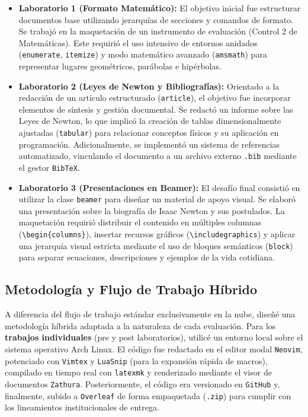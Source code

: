 \begin{itemize}
	\item \textbf{Laboratorio 1 (Formato Matemático):} El objetivo inicial fue estructurar documentos base utilizando jerarquías de secciones y comandos de formato. Se trabajó en la maquetación de un instrumento de evaluación (Control 2 de Matemáticas). Este requirió el uso intensivo de entornos anidados (\texttt{enumerate}, \texttt{itemize}) y modo matemático avanzado (\texttt{amsmath}) para representar lugares geométricos, parábolas e hipérbolas.

	\item \textbf{Laboratorio 2 (Leyes de Newton y Bibliografías):} Orientado a la redacción de un artículo estructurado (\texttt{article}), el objetivo fue incorporar elementos de síntesis y gestión documental. Se redactó un informe sobre las Leyes de Newton, lo que implicó la creación de tablas dimensionalmente ajustadas (\texttt{tabular}) para relacionar conceptos físicos y su aplicación en programación. Adicionalmente, se implementó un sistema de referencias automatizado, vinculando el documento a un archivo externo \texttt{.bib} mediante el gestor \texttt{BibTeX}.

	\item \textbf{Laboratorio 3 (Presentaciones en Beamer):} El desafío final consistió en utilizar la clase \texttt{beamer} para diseñar un material de apoyo visual. Se elaboró una presentación sobre la biografía de Isaac Newton y sus postulados. La maquetación requirió distribuir el contenido en múltiples columnas (\texttt{\textbackslash begin\{columns\}}), insertar recursos gráficos (\texttt{\textbackslash includegraphics}) y aplicar una jerarquía visual estricta mediante el uso de bloques semánticos (\texttt{block}) para separar ecuaciones, descripciones y ejemplos de la vida cotidiana.
\end{itemize}

\subsection{Metodología y Flujo de Trabajo Híbrido}

A diferencia del flujo de trabajo estándar exclusivamente en la nube, diseñé una metodología híbrida adaptada a la naturaleza de cada evaluación. Para los \textbf{trabajos individuales} (pre y post laboratorios), utilicé un entorno local sobre el sistema operativo Arch Linux. El código fue redactado en el editor modal \texttt{Neovim}, potenciado con \texttt{Vimtex} y \texttt{LuaSnip} (para la expansión rápida de macros), compilado en tiempo real con \texttt{latexmk} y renderizado mediante el visor de documentos \texttt{Zathura}. Posteriormente, el código era versionado en \texttt{GitHub} y, finalmente, subido a \texttt{Overleaf} de forma empaquetada (\texttt{.zip}) para cumplir con los lineamientos institucionales de entrega.

